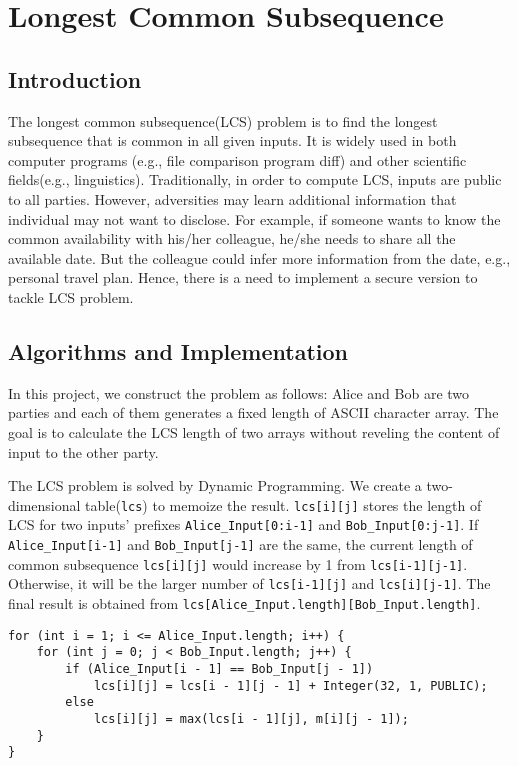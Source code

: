 \section{Longest Common Subsequence}

\subsection{Introduction}
The longest common subsequence(LCS) problem is to find the longest subsequence that is common in all given inputs.
It is widely used in both computer programs (e.g., file comparison program diff) and other scientific fields(e.g., linguistics).
Traditionally, in order to compute LCS, inputs are public to all parties.
However, adversities may learn additional information that individual may not want to disclose.
For example, if someone wants to know the common availability with his/her colleague, he/she needs to share all the available date.
But the colleague could infer more information from the date, e.g., personal travel plan.
Hence, there is a need to implement a secure version to tackle LCS problem.


\subsection{Algorithms and Implementation}
In this project, we construct the problem as follows: Alice and Bob are two parties and each of them generates a fixed length of ASCII character array.
The goal is to calculate the LCS length of two arrays without reveling the content of input to the other party.

The LCS problem is solved by Dynamic Programming.
We create a two-dimensional table({\tt lcs}) to memoize the result.
{\tt lcs[i][j]} stores the length of LCS for two inputs' prefixes {\tt Alice\_Input[0:i-1]} and {\tt Bob\_Input[0:j-1]}.
If {\tt Alice\_Input[i-1]} and {\tt Bob\_Input[j-1]} are the same, the current length of common subsequence {\tt lcs[i][j]} would increase by 1 from {\tt lcs[i-1][j-1]}.
Otherwise, it will be the larger number of {\tt lcs[i-1][j]} and {\tt lcs[i][j-1]}.
The final result is obtained from {\tt lcs[Alice\_Input.length][Bob\_Input.length]}.


\begin{verbatim}
for (int i = 1; i <= Alice_Input.length; i++) {
    for (int j = 0; j < Bob_Input.length; j++) {
        if (Alice_Input[i - 1] == Bob_Input[j - 1])
            lcs[i][j] = lcs[i - 1][j - 1] + Integer(32, 1, PUBLIC);
        else
            lcs[i][j] = max(lcs[i - 1][j], m[i][j - 1]);
    }
}
\end{verbatim}